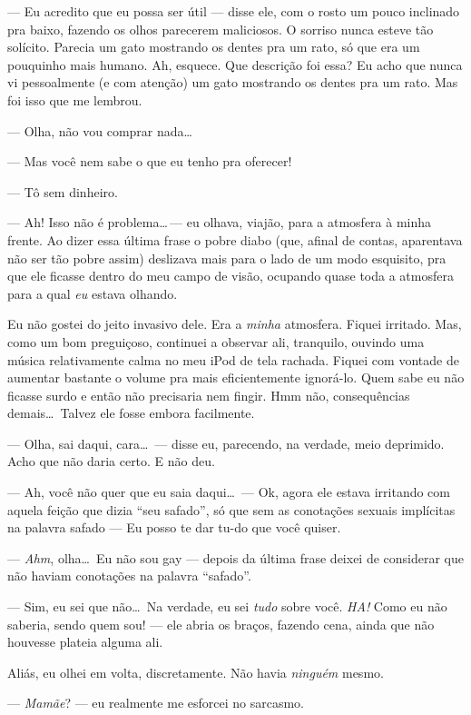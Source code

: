 --- Eu acredito que eu possa ser útil --- disse ele, com o rosto um pouco inclinado pra baixo, fazendo os olhos parecerem maliciosos. O sorriso nunca esteve tão solícito. Parecia um gato mostrando os dentes pra um rato, só que era um pouquinho mais humano. Ah, esquece. Que descrição foi essa? Eu acho que nunca vi pessoalmente (e com atenção) um gato mostrando os dentes pra um rato. Mas foi isso que me lembrou.

--- Olha, não vou comprar nada\ldots

--- Mas você nem sabe o que eu tenho pra oferecer!

--- Tô sem dinheiro.

--- Ah! Isso não é problema\ldots\,--- eu olhava, viajão, para a atmosfera à minha frente. Ao dizer essa última frase o pobre diabo (que, afinal de contas, aparentava não ser tão pobre assim) deslizava mais para o lado de um modo esquisito, pra que ele ficasse dentro do meu campo de visão, ocupando quase toda a atmosfera para a qual \emph{eu} estava olhando.

Eu não gostei do jeito invasivo dele. Era a \emph{minha} atmosfera. Fiquei irritado. Mas, como um bom preguiçoso, continuei a observar ali, tranquilo, ouvindo uma música relativamente calma no meu iPod de tela rachada. Fiquei com vontade de aumentar bastante o volume pra mais eficientemente ignorá-lo. Quem sabe eu não ficasse surdo e então não precisaria nem fingir. Hmm não, consequências demais\ldots \ Talvez ele fosse embora facilmente.

--- Olha, sai daqui, cara\ldots \ --- disse eu, parecendo, na verdade, meio deprimido. Acho que não daria certo. E não deu.

--- Ah, você não quer que eu saia daqui\ldots \ --- Ok, agora ele estava irritando com aquela feição que dizia ``seu safado'', só que sem as conotações sexuais implícitas na palavra safado --- Eu posso te dar tu-do que você quiser.

--- \emph{Ahm}, olha\ldots \ Eu não sou gay --- depois da última frase deixei de considerar que não haviam conotações na palavra ``safado''.

--- Sim, eu sei que não\ldots \ Na verdade, eu sei \emph{tudo} sobre você. \emph{HA!} Como eu não saberia, sendo quem sou! --- ele abria os braços, fazendo cena, ainda que não houvesse plateia alguma ali.

Aliás, eu olhei em volta, discretamente. Não havia \emph{ninguém} mesmo.

--- \emph{Mamãe}? --- eu realmente me esforcei no sarcasmo.


